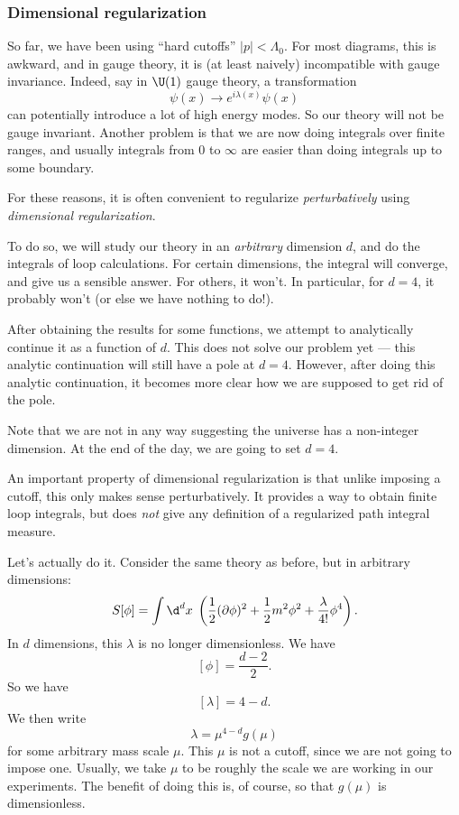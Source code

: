 \documentclass[a4paper]{article}
\begin{document}
\subsubsection*{Dimensional regularization}
So far, we have been using ``hard cutoffs'' $|p| < \Lambda_0$. For most diagrams, this is awkward, and in gauge theory, it is (at least naively) incompatible with gauge invariance. Indeed, say in $\U(1)$ gauge theory, a transformation
\[
  \psi(x) \to e^{i\lambda(x)} \psi(x)
\]
can potentially introduce a lot of high energy modes. So our theory will not be gauge invariant. Another problem is that we are now doing integrals over finite ranges, and usually integrals from $0$ to $\infty$ are easier than doing integrals up to some boundary.

For these reasons, it is often convenient to regularize \emph{perturbatively} using \emph{dimensional regularization}.

To do so, we will study our theory in an \emph{arbitrary} dimension $d$, and do the integrals of loop calculations. For certain dimensions, the integral will converge, and give us a sensible answer. For others, it won't. In particular, for $d = 4$, it probably won't (or else we have nothing to do!).

After obtaining the results for some functions, we attempt to analytically continue it as a function of $d$. This does not solve our problem yet --- this analytic continuation will still have a pole at $d = 4$. However, after doing this analytic continuation, it becomes more clear how we are supposed to get rid of the pole.

Note that we are not in any way suggesting the universe has a non-integer dimension. At the end of the day, we are going to set $d = 4$.

An important property of dimensional regularization is that unlike imposing a cutoff, this only makes sense perturbatively. It provides a way to obtain finite loop integrals, but does \emph{not} give any definition of a regularized path integral measure.

Let's actually do it. Consider the same theory as before, but in arbitrary dimensions:
\[
  S[\phi] = \int \d^d x\; \left(\frac{1}{2} (\partial \phi)^2 + \frac{1}{2} m^2 \phi^2 + \frac{\lambda}{4!} \phi^4\right).
\]
In $d$ dimensions, this $\lambda$ is no longer dimensionless. We have
\[
  [\phi] = \frac{d - 2}{2}.
\]
So we have
\[
  [\lambda] = 4 - d.
\]
We then write
\[
  \lambda = \mu^{4 - d} g(\mu)
\]
for some arbitrary mass scale $\mu$. This $\mu$ is not a cutoff, since we are not going to impose one. Usually, we take $\mu$ to be roughly the scale we are working in our experiments. The benefit of doing this is, of course, so that $g(\mu)$ is dimensionless.
\end{document}
